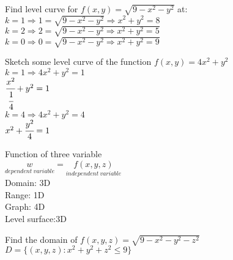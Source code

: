 \noindent{\color{smalt(darkpowderblue)}\rule{\linewidth}{.2mm}}
\begin{example}
Find level curve for $f(x,y)=\sqrt{9-x^2-y^2}$ at:\\ $k=1\Rightarrow1=\sqrt{9-x^2-y^2}\Rightarrow x^2+y^2=8$\\
$k=2\Rightarrow 2=\sqrt{9-x^2-y^2\Rightarrow x^2+y^2=5}$\\
$k=0\Rightarrow 0=\sqrt{9-x^2-y^2\Rightarrow x^2+y^2=9}$
\end{example}
\noindent{\color{smalt(darkpowderblue)}\rule{\linewidth}{.2mm}}
\begin{example}
Sketch some level curve of the function $f(x,y)=4x^2+y^2$\\
$k=1\Rightarrow 4x^2+y^2=1$\\
$\cfrac{x^2}{\cfrac{1}{4}}+y^2=1$\\
$k=4\Rightarrow 4x^2+y^2=4$\\
$x^2+\cfrac{y^2}{4}=1$
\end{example}
\noindent{\color{smalt(darkpowderblue)}\rule{\linewidth}{.2mm}}
\begin{definition}
Function of three variable \\
$\underset{dependent~variable}{w}=\underset{independent~variable}{f(x,y,z)}$\\
Domain: 3D\\
Range: 1D\\
Graph: 4D\\
Level surface:3D
\end{definition}
\begin{example}
Find the domain of $f(x,y,z)=\sqrt{9-x^2-y^2-z^2}$\\
$D=\{(x,y,z):x^2+y^2+z^2\leq9\}$
\end{example}
\noindent{\color{smalt(darkpowderblue)}\rule{\linewidth}{.2mm}}
